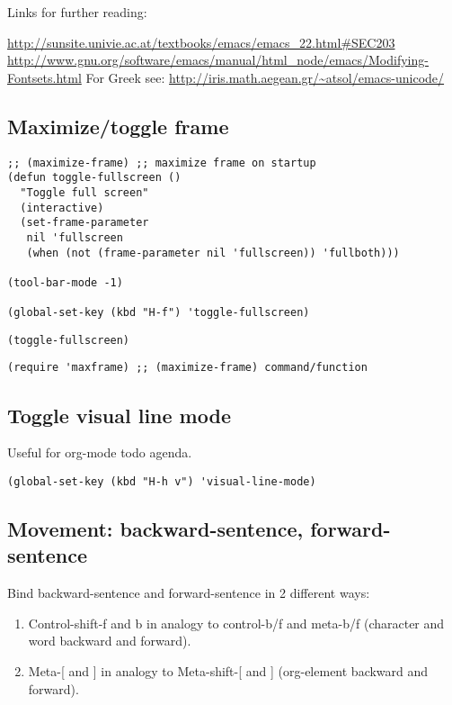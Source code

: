 \documentclass{article}
\begin{document}
Links for further reading:

\url{http://sunsite.univie.ac.at/textbooks/emacs/emacs_22.html#SEC203}
\url{http://www.gnu.org/software/emacs/manual/html_node/emacs/Modifying-Fontsets.html}
For Greek see: \url{http://iris.math.aegean.gr/~atsol/emacs-unicode/}

\subsection{Maximize/toggle frame}
\label{sec-1-7}
\begin{verbatim}
;; (maximize-frame) ;; maximize frame on startup
(defun toggle-fullscreen ()
  "Toggle full screen"
  (interactive)
  (set-frame-parameter
   nil 'fullscreen
   (when (not (frame-parameter nil 'fullscreen)) 'fullboth)))

(tool-bar-mode -1)

(global-set-key (kbd "H-f") 'toggle-fullscreen)
\end{verbatim}

\begin{verbatim}
(toggle-fullscreen)
\end{verbatim}

\begin{verbatim}
(require 'maxframe) ;; (maximize-frame) command/function
\end{verbatim}
\subsection{Toggle visual line mode}
\label{sec-1-8}

Useful for org-mode todo agenda.

\begin{verbatim}
(global-set-key (kbd "H-h v") 'visual-line-mode)
\end{verbatim}
\subsection{Movement: backward-sentence, forward-sentence}
\label{sec-1-9}

Bind backward-sentence and forward-sentence in 2 different ways:

\begin{enumerate}
\item Control-shift-f and b in analogy to control-b/f and meta-b/f (character and word backward and forward).
\item Meta-[ and ] in analogy to Meta-shift-[ and ] (org-element backward and forward).
\end{enumerate}
\end{document}
